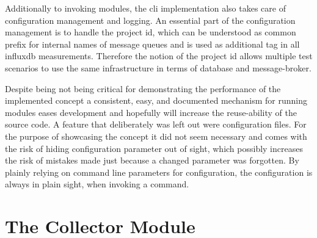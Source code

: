 Additionally to invoking modules, the \gls{cli} implementation also takes care of configuration management and logging.
An essential part of the configuration management is to handle the project id, which can be understood as common prefix for internal names of message queues and is used as additional tag in all \gls{influxdb} measurements. Therefore the notion of the project id allows multiple test scenarios to use the same infrastructure in terms of database and message-broker.

Despite being not being critical for demonstrating the performance of the implemented concept a consistent, easy, and documented mechanism for running modules eases development and hopefully will increase the reuse-ability of the source code.
A feature that deliberately was left out were configuration files. For the purpose of showcasing the concept it did not seem necessary and comes with the risk of hiding configuration parameter out of sight, which possibly increases the risk of mistakes made just because a changed parameter was forgotten. By plainly relying on command line parameters for configuration, the configuration is always in plain sight, when invoking a command.

\section{The Collector Module}
\label{sec:impl:collector}

\begin{comment}
\begin{itemize}
	\item central hub for relaying information
	\item receives agent windows via \gls{amqp} message broker (cf. Figure~\ref{fig:concept:architecture})
	\item subscribed to the agent topic using \gls{lib-pika} version 0.11
	\item incoming windows from agents are stored immediately in \gls{influxdb}
	\item every 4 seconds a callback \hint{(other word for callback?)} is called
	\item callback queries \gls{influxdb} for not relayed windows
		\subitem ordered latest first
		\subitem so a cumulating backlog does not affect the ability to show/process near-real-time metrics
		\subitem old windows will be processed once backlog decreases
	\item collector groups windows by timeslot
		\subitem so analysers receive a snapshot of the network
		\subitem allows them to analyse world-view without the need to compensate time-difference
\end{itemize}
\end{comment}

